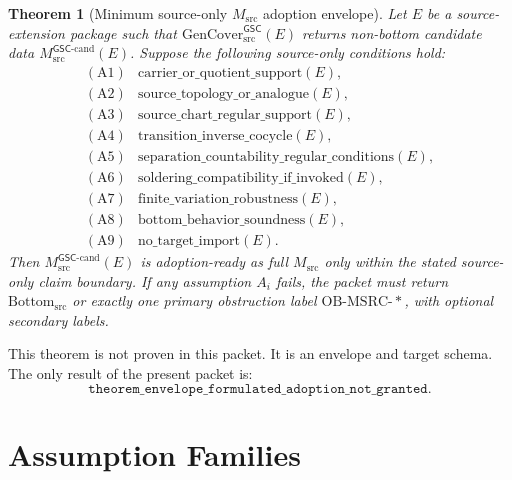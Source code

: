\documentclass[11pt]{article}
\newcommand{\GSC}{\mathsf{GSC}}
\newcommand{\Msrc}{M_{\mathrm{src}}}
\newcommand{\Mgsccand}{M_{\mathrm{src}}^{\GSC\mbox{-}\mathrm{cand}}}
\newcommand{\Bottomsrc}{\mathrm{Bottom}_{\mathrm{src}}}
\newcommand{\GenCover}{\mathrm{GenCover}_{\mathrm{src}}^{\GSC}}
\newtheorem{theorem}{Theorem}
\begin{document}
\begin{theorem}[Minimum source-only \(\Msrc\) adoption envelope]
Let \(E\) be a source-extension package such that \(\GenCover(E)\) returns
non-bottom candidate data \(\Mgsccand(E)\). Suppose the following source-only
conditions hold:
\[
\begin{array}{ll}
\mathrm{(A1)} & \mathrm{carrier\_or\_quotient\_support}(E),\\
\mathrm{(A2)} & \mathrm{source\_topology\_or\_analogue}(E),\\
\mathrm{(A3)} & \mathrm{source\_chart\_regular\_support}(E),\\
\mathrm{(A4)} & \mathrm{transition\_inverse\_cocycle}(E),\\
\mathrm{(A5)} & \mathrm{separation\_countability\_regular\_conditions}(E),\\
\mathrm{(A6)} & \mathrm{soldering\_compatibility\_if\_invoked}(E),\\
\mathrm{(A7)} & \mathrm{finite\_variation\_robustness}(E),\\
\mathrm{(A8)} & \mathrm{bottom\_behavior\_soundness}(E),\\
\mathrm{(A9)} & \mathrm{no\_target\_import}(E).
\end{array}
\]
Then \(\Mgsccand(E)\) is adoption-ready as full \(\Msrc\) only within the
stated source-only claim boundary. If any assumption \(A_i\) fails, the
packet must return \(\Bottomsrc\) or exactly one primary obstruction label
\(\mathrm{OB\mbox{-}MSRC\mbox{-}*}\), with optional secondary labels.
\end{theorem}

This theorem is not proven in this packet. It is an envelope and target schema.
The only result of the present packet is:
\[
  \texttt{theorem\_envelope\_formulated\_adoption\_not\_granted}.
\]

\section{Assumption Families}
\end{document}
